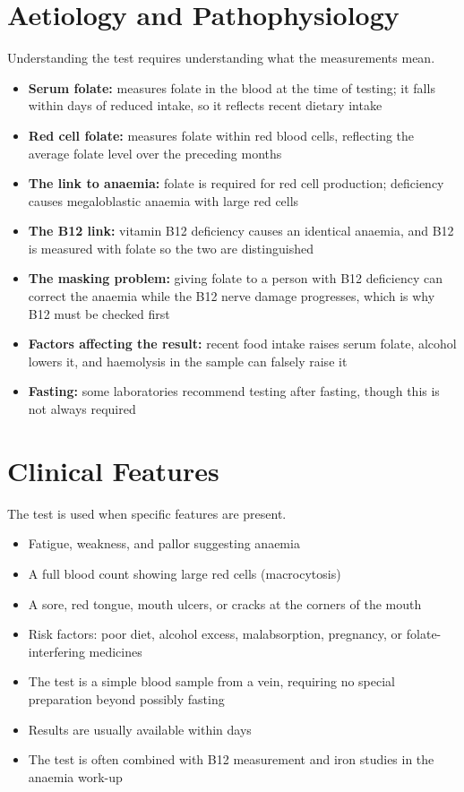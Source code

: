 \section*{Aetiology and Pathophysiology}
Understanding the test requires understanding what the measurements mean.
\begin{itemize}
    \item \textbf{Serum folate:} measures folate in the blood at the time of testing; it falls within days of reduced intake, so it reflects recent dietary intake
    \item \textbf{Red cell folate:} measures folate within red blood cells, reflecting the average folate level over the preceding months
    \item \textbf{The link to anaemia:} folate is required for red cell production; deficiency causes megaloblastic anaemia with large red cells
    \item \textbf{The B12 link:} vitamin B12 deficiency causes an identical anaemia, and B12 is measured with folate so the two are distinguished
    \item \textbf{The masking problem:} giving folate to a person with B12 deficiency can correct the anaemia while the B12 nerve damage progresses, which is why B12 must be checked first
    \item \textbf{Factors affecting the result:} recent food intake raises serum folate, alcohol lowers it, and haemolysis in the sample can falsely raise it
    \item \textbf{Fasting:} some laboratories recommend testing after fasting, though this is not always required
\end{itemize}

\section*{Clinical Features}
The test is used when specific features are present.
\begin{itemize}
    \item Fatigue, weakness, and pallor suggesting anaemia
    \item A full blood count showing large red cells (macrocytosis)
    \item A sore, red tongue, mouth ulcers, or cracks at the corners of the mouth
    \item Risk factors: poor diet, alcohol excess, malabsorption, pregnancy, or folate-interfering medicines
    \item The test is a simple blood sample from a vein, requiring no special preparation beyond possibly fasting
    \item Results are usually available within days
    \item The test is often combined with B12 measurement and iron studies in the anaemia work-up
\end{itemize}

